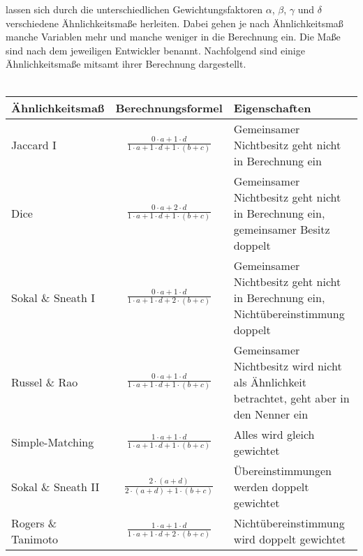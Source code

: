 lassen sich durch die unterschiedlichen Gewichtungsfaktoren $\alpha$, $\beta$, $\gamma$ und $\delta$ verschiedene Ähnlichkeitsmaße herleiten. Dabei gehen je nach Ähnlichkeitsmaß manche Variablen mehr und manche weniger in die Berechnung ein. Die Maße sind nach dem jeweiligen Entwickler benannt.
Nachfolgend sind einige Ähnlichkeitsmaße mitsamt ihrer Berechnung dargestellt. \\ 
\\
\begin{tabular}{|l|c|p{8cm}|}
	\hline
	\rowcolor{babyblueeyes}Ähnlichkeitsmaß & Berechnungsformel & Eigenschaften \\ \hline
	\rowcolor{beaublue}Jaccard I & $\frac{0 \cdot \textit{a} + 1 \cdot \textit{d}}{1 \cdot \textit{a} + 1 \cdot \textit{d} + 1 \cdot (\textit{b} + \textit{c})} $ & Gemeinsamer Nichtbesitz geht nicht in Berechnung ein \\ \hline
	\rowcolor{beaublue}Dice & $ \frac{0 \cdot \textit{a} + 2 \cdot \textit{d}}{1 \cdot \textit{a} + 1 \cdot \textit{d} + 1 \cdot (\textit{b} + \textit{c})} $ & Gemeinsamer Nichtbesitz geht nicht in Berechnung ein, gemeinsamer Besitz doppelt \\ \hline
	\rowcolor{beaublue}Sokal \& Sneath I & $ \frac{0 \cdot \textit{a} + 1 \cdot \textit{d}}{1 \cdot \textit{a} + 1 \cdot \textit{d} + 2 \cdot (\textit{b} + \textit{c})} $ & Gemeinsamer Nichtbesitz geht nicht in Berechnung ein, Nichtübereinstimmung doppelt \\ \hline
	\rowcolor{beaublue}Russel \& Rao & $ \frac{0 \cdot \textit{a} + 1 \cdot \textit{d}}{1 \cdot \textit{a} + 1 \cdot \textit{d} + 1 \cdot (\textit{b} + \textit{c})} $ & Gemeinsamer Nichtbesitz wird nicht als Ähnlichkeit betrachtet, geht aber in den Nenner ein \\ \hline
	\rowcolor{beaublue}Simple-Matching & $ \frac{1 \cdot \textit{a} + 1 \cdot \textit{d}}{1 \cdot \textit{a} + 1 \cdot \textit{d} + 1 \cdot (\textit{b} + \textit{c})} $ & Alles wird gleich gewichtet \\ \hline
	\rowcolor{beaublue}Sokal \& Sneath II & $ \frac{2 \cdot (\textit{a} + \textit{d})}{2 \cdot (\textit{a} + \textit{d}) + 1 \cdot (\textit{b} + \textit{c})} $ & Übereinstimmungen werden doppelt gewichtet \\ \hline
	\rowcolor{beaublue}Rogers \& Tanimoto & $ \frac{1 \cdot \textit{a} + 1 \cdot \textit{d}}{1 \cdot a + 1 \cdot \textit{d} + 2 \cdot (\textit{b} + \textit{c})} $ & Nichtübereinstimmung wird doppelt gewichtet \\ \hline
\end{tabular}
	

